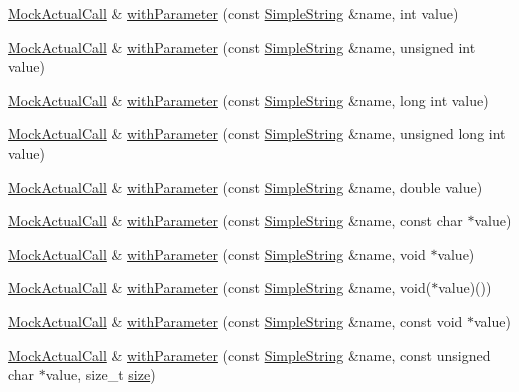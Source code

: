 \begin{DoxyCompactItemize}
\hyperlink{class_mock_actual_call}{Mock\+Actual\+Call} \& \hyperlink{class_mock_actual_call_abec25d19fe41e8acb31af0130704aa6b}{with\+Parameter} (const \hyperlink{class_simple_string}{Simple\+String} \&name, int value)
\item 
\hyperlink{class_mock_actual_call}{Mock\+Actual\+Call} \& \hyperlink{class_mock_actual_call_ae18a228b6f5e0260c239a22fd94c2353}{with\+Parameter} (const \hyperlink{class_simple_string}{Simple\+String} \&name, unsigned int value)
\item 
\hyperlink{class_mock_actual_call}{Mock\+Actual\+Call} \& \hyperlink{class_mock_actual_call_ac481a5b2a6c2b48d081b88d514f94332}{with\+Parameter} (const \hyperlink{class_simple_string}{Simple\+String} \&name, long int value)
\item 
\hyperlink{class_mock_actual_call}{Mock\+Actual\+Call} \& \hyperlink{class_mock_actual_call_aeb2eccd3b3b4d5820e35401d6daec7b2}{with\+Parameter} (const \hyperlink{class_simple_string}{Simple\+String} \&name, unsigned long int value)
\item 
\hyperlink{class_mock_actual_call}{Mock\+Actual\+Call} \& \hyperlink{class_mock_actual_call_ae2623cd5773f529096615eb84bc2a88d}{with\+Parameter} (const \hyperlink{class_simple_string}{Simple\+String} \&name, double value)
\item 
\hyperlink{class_mock_actual_call}{Mock\+Actual\+Call} \& \hyperlink{class_mock_actual_call_ab299726011d5c80eabc64589a07caab4}{with\+Parameter} (const \hyperlink{class_simple_string}{Simple\+String} \&name, const char $\ast$value)
\item 
\hyperlink{class_mock_actual_call}{Mock\+Actual\+Call} \& \hyperlink{class_mock_actual_call_a73f6c72584163c0853b8c76b61f5d8d2}{with\+Parameter} (const \hyperlink{class_simple_string}{Simple\+String} \&name, void $\ast$value)
\item 
\hyperlink{class_mock_actual_call}{Mock\+Actual\+Call} \& \hyperlink{class_mock_actual_call_a2179debe76f390842cb8f94786273f8d}{with\+Parameter} (const \hyperlink{class_simple_string}{Simple\+String} \&name, void($\ast$value)())
\item 
\hyperlink{class_mock_actual_call}{Mock\+Actual\+Call} \& \hyperlink{class_mock_actual_call_a3d3f4588e0e927961590b55e117e898f}{with\+Parameter} (const \hyperlink{class_simple_string}{Simple\+String} \&name, const void $\ast$value)
\item 
\hyperlink{class_mock_actual_call}{Mock\+Actual\+Call} \& \hyperlink{class_mock_actual_call_a59ab8948e17207f3bb15facb8869e266}{with\+Parameter} (const \hyperlink{class_simple_string}{Simple\+String} \&name, const unsigned char $\ast$value, size\+\_\+t \hyperlink{gst__avb__playbin_8c_a439227feff9d7f55384e8780cfc2eb82}{size})
\end{DoxyCompactItemize}
